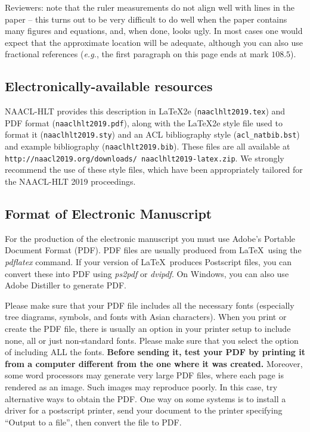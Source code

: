 \documentclass{article}
\begin{document}
Reviewers: note that the ruler measurements do not align well with
lines in the paper -- this turns out to be very difficult to do well
when the paper contains many figures and equations, and, when done,
looks ugly. In most cases one would expect that the approximate
location will be adequate, although you can also use fractional
references ({\em e.g.}, the first paragraph on this page ends at mark $108.5$).

\subsection{Electronically-available resources}

NAACL-HLT provides this description in \LaTeX2e{} ({\small\tt naaclhlt2019.tex}) and PDF
format ({\small\tt naaclhlt2019.pdf}), along with the \LaTeX2e{} style file used to
format it ({\small\tt naaclhlt2019.sty}) and an ACL bibliography style ({\small\tt acl\_natbib.bst})
and example bibliography ({\small\tt naaclhlt2019.bib}).
These files are all available at
{\small\tt http://naacl2019.org/downloads/ naaclhlt2019-latex.zip}. 
 We
strongly recommend the use of these style files, which have been
appropriately tailored for the NAACL-HLT 2019 proceedings.

\subsection{Format of Electronic Manuscript}
\label{sect:pdf}

For the production of the electronic manuscript you must use Adobe's
Portable Document Format (PDF). PDF files are usually produced from
\LaTeX\ using the \textit{pdflatex} command. If your version of
\LaTeX\ produces Postscript files, you can convert these into PDF
using \textit{ps2pdf} or \textit{dvipdf}. On Windows, you can also use
Adobe Distiller to generate PDF.

Please make sure that your PDF file includes all the necessary fonts
(especially tree diagrams, symbols, and fonts with Asian
characters). When you print or create the PDF file, there is usually
an option in your printer setup to include none, all or just
non-standard fonts.  Please make sure that you select the option of
including ALL the fonts. \textbf{Before sending it, test your PDF by
  printing it from a computer different from the one where it was
  created.} Moreover, some word processors may generate very large PDF
files, where each page is rendered as an image. Such images may
reproduce poorly. In this case, try alternative ways to obtain the
PDF. One way on some systems is to install a driver for a postscript
printer, send your document to the printer specifying ``Output to a
file'', then convert the file to PDF.
\end{document}

